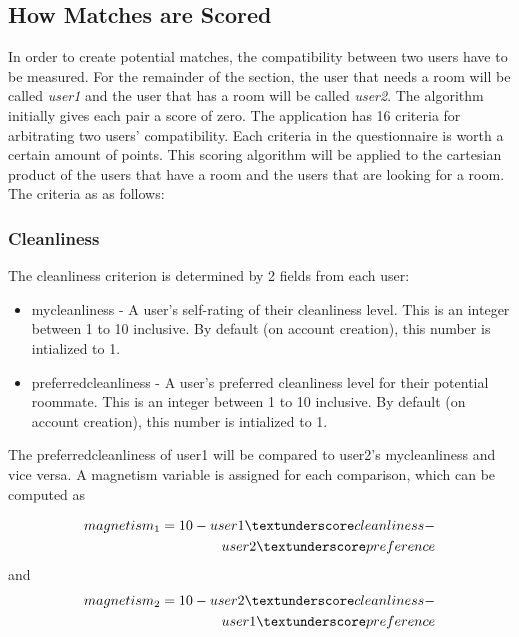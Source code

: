 \documentclass[journal]{IEEEtran}
\begin{document}
\subsection{How Matches are Scored}
In order to create potential matches, the compatibility between two users have to be measured. For the remainder of the
section, the user that needs a room will be called \textit{user1} and the user that has a room will be called
\textit{user2}. The algorithm initially gives each pair a score of zero. The application has 16 criteria for arbitrating
two users' compatibility. Each criteria in the questionnaire is worth a certain amount of points.  This scoring
algorithm will be applied to the cartesian product of the users that have a room and the users that are looking for a
room. The criteria as as follows:

    \subsubsection{Cleanliness}
        The cleanliness criterion is determined by 2 fields from each user:
        \begin{itemize}
                \item my\textunderscore cleanliness - A user's self-rating of their cleanliness level. This is an
                    integer between 1 to 10 inclusive. By default (on account creation), this number is intialized to 1.
                \item preferred\textunderscore cleanliness - A user's preferred cleanliness level for their
                    potential roommate. This is an integer between 1 to 10 inclusive. By default (on account creation),
                    this number is intialized to 1.

        \end{itemize}

        The preferred\textunderscore cleanliness of user1 will be compared to user2's my\textunderscore cleanliness and
        vice versa. A magnetism variable is assigned for each comparison, which can be computed as

        \begin{equation}
            \begin{split}
                magnetism_1 = 10 - user1\textunderscore cleanliness - \\
                user2\textunderscore preference
            \end{split}
        \end{equation}
        and
        \begin{equation}
            \begin{split}
                magnetism_2 = 10 - user2\textunderscore cleanliness - \\
                user1\textunderscore preference
            \end{split}
        \end{equation}
\end{document}
